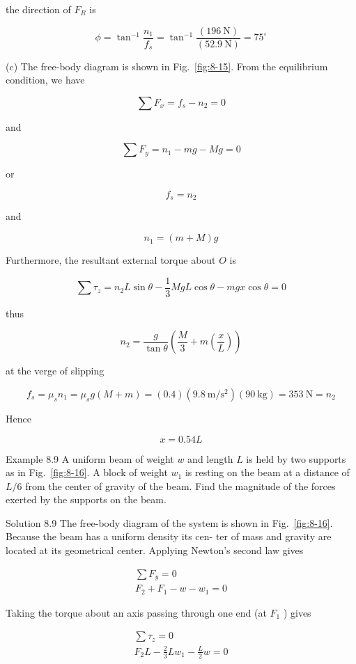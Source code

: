 \documentclass[10pt]{article}
\numberwithin{equation}{section}
\begin{document}
the direction of $F_{R}$ is

$$
\phi=\tan ^{-1} \frac{n_{1}}{f_{s}}=\tan ^{-1} \frac{(196 \mathrm{~N})}{(52.9 \mathrm{~N})}=75^{\circ}
$$

(c) The free-body diagram is shown in Fig.~\ref{fig:8-15}. From the equilibrium condition, we have

$$
\sum F_{x}=f_{s}-n_{2}=0
$$

and

$$
\sum F_{y}=n_{1}-m g-M g=0
$$

or

$$
f_{s}=n_{2}
$$

and

$$
n_{1}=(m+M) g
$$

Furthermore, the resultant external torque about $O$ is

$$
\sum \tau_{z}=n_{2} L \sin \theta-\frac{1}{3} M g L \cos \theta-m g x \cos \theta=0
$$

thus

$$
n_{2}=\frac{g}{\tan \theta}\left(\frac{M}{3}+m\left(\frac{x}{L}\right)\right)
$$

at the verge of slipping

$$
f_{s}=\mu_{s} n_{1}=\mu_{s} g(M+m)=(0.4)\left(9.8 \mathrm{~m} / \mathrm{s}^{2}\right)(90 \mathrm{~kg})=353 \mathrm{~N}=n_{2}
$$

Hence

$$
x=0.54 L
$$

Example 8.9 A uniform beam of weight $w$ and length $L$ is held by two supports as in Fig.~\ref{fig:8-16}. A block of weight $w_{1}$ is resting on the beam at a distance of $L / 6$ from the center of gravity of the beam. Find the magnitude of the forces exerted by the supports on the beam.

Solution 8.9 The free-body diagram of the system is shown in Fig.~\ref{fig:8-16}. Because the beam has a uniform density its cen- ter of mass and gravity are located at its geometrical center. Applying Newton's second law gives


\begin{gather}
\sum F_{y}=0 \\
F_{2}+F_{1}-w-w_{1}=0 \label{eq:8-13}
\end{gather}


Taking the torque about an axis passing through one end (at $F_{1}$ ) gives


\begin{gather}
\sum \tau_{z}=0 \\
F_{2} L-\frac{2}{3} L w_{1}-\frac{L}{2} w=0 \label{eq:8-14}
\end{gather}
\end{document}
